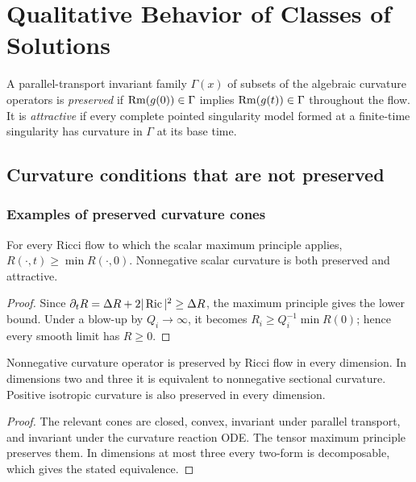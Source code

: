 \chapter{Qualitative Behavior of Classes of Solutions}
\label{ch:chow-ii-qualitative-behavior}

A parallel-transport invariant family \(\Gamma(x)\) of subsets of the
algebraic curvature operators is \emph{preserved} if
\(\operatorname{Rm}(g(0))\in\Gamma\) implies \(\operatorname{Rm}(g(t))\in\Gamma\) throughout the flow.
It is \emph{attractive} if every complete pointed singularity model formed at
a finite-time singularity has curvature in \(\Gamma\) at its base time.

\section{Curvature conditions that are not preserved}

\subsection{Examples of preserved curvature cones}

\begin{example}
\label{ex:chow-ii-nonnegative-scalar-preserved-attractive}
For every Ricci flow to which the scalar maximum principle applies,
\(R(\cdot,t)\geq\min R(\cdot,0)\).  Nonnegative scalar curvature is both
preserved and attractive.
\end{example}
\begin{proof}
Since \(\partial_tR=\Delta R+2|\operatorname{Ric}|^2\geq\Delta R\), the maximum principle
gives the lower bound.  Under a blow-up by \(Q_i\to\infty\), it becomes
\(R_i\geq Q_i^{-1}\min R(0)\); hence every smooth limit has \(R\geq0\).
\end{proof}

\begin{example}
\label{ex:chow-ii-nonnegative-curvature-operator-preserved}
Nonnegative curvature operator is preserved by Ricci flow in every dimension.
In dimensions two and three it is equivalent to nonnegative sectional
curvature.  Positive isotropic curvature is also preserved in every dimension.
\end{example}
\begin{proof}
The relevant cones are closed, convex, invariant under parallel transport,
and invariant under the curvature reaction ODE.  The tensor maximum principle
preserves them.  In dimensions at most three every two-form is decomposable,
which gives the stated equivalence.
\end{proof}

